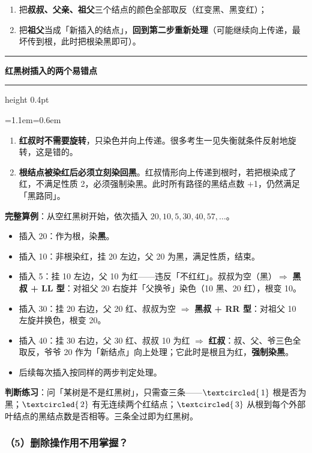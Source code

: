 \documentclass[11pt,openany,UTF8]{ctexbook}
\newcommand{\circled}[1]{\textcircled{\scriptsize\,#1}}
\newcommand{\callouthead}[2]{%
  \par\addvspace{7pt}\noindent
  {\color{#1}\rule[-0.15em]{3pt}{1.05em}}\hspace{0.5em}%
  {\bfseries\color{#1}#2}\par\nobreak\vspace{-0.35em}%
  {\color{rulesep}\hrule height 0.4pt}\nobreak\vspace{0.45em}%
  \begingroup\small\setlength{\parindent}{0pt}%
  \leftskip=1.1em\rightskip=0.6em\noindent\ignorespaces}
\newcommand{\calloutend}{\par\endgroup\addvspace{7pt}}
\newenvironment{callwarn}[1]{\callouthead{warnbar}{#1}}{\calloutend}
\begin{document}
\begin{enumerate}
\item 把\textbf{叔叔、父亲、祖父}三个结点的颜色全部取反（红变黑、黑变红）；
\item 把\textbf{祖父}当成「新插入的结点」，\textbf{回到第二步重新处理}（可能继续向上传递，最坏传到根，此时把根染黑即可）。
\end{enumerate}
\begin{callwarn}{红黑树插入的两个易错点}
\begin{enumerate}
\item \textbf{红叔时不需要旋转}，只染色并向上传递。很多考生一见失衡就条件反射地旋转，这是错的。
\item \textbf{根结点被染红后必须立刻染回黑}。红叔情形向上传递到根时，若把根染成了红，不满足性质 2，必须强制染黑。此时所有路径的黑结点数 +1，仍然满足「黑路同」。
\end{enumerate}
\end{callwarn}

\textbf{完整算例}：从空红黑树开始，依次插入 $20,10,5,30,40,57,\ldots$。

\begin{itemize}
\item 插入 20：作为根，染\textbf{黑}。
\item 插入 10：非根染红，挂 20 左边，父 20 为黑，满足性质，结束。
\item 插入 5：挂 10 左边，父 10 为红——违反「不红红」。叔叔为空（黑）$\Rightarrow$ \textbf{黑叔 + LL 型}：对祖父 20 右旋并「父换爷」染色（10 黑、20 红），根变 10。
\item 插入 30：挂 20 右边，父 20 红、叔叔为空 $\Rightarrow$ \textbf{黑叔 + RR 型}：对祖父 10 左旋并换色，根变 20。
\item 插入 40：挂 30 右边，父 30 红、叔叔 10 为红 $\Rightarrow$ \textbf{红叔}：叔、父、爷三色全取反，爷爷 20 作为「新结点」向上处理；它此时是根且为红，\textbf{强制染黑}。
\item 后续每次插入按同样的两步判定处理。
\end{itemize}
\textbf{判断练习}：问「某树是不是红黑树」，只需查三条——$\circled{1}$ 根是否为黑；$\circled{2}$ 有无连续两个红结点；$\circled{3}$ 从根到每个外部叶结点的黑结点数是否相等。三条全过即为红黑树。

\subsubsection{（5）删除操作用不用掌握？}
\end{document}

